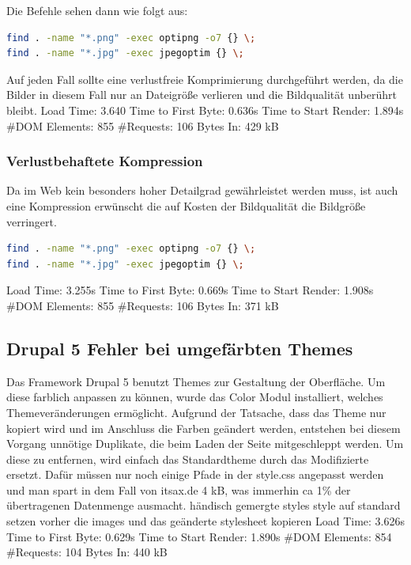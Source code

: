 Die Befehle sehen dann wie folgt aus:

\begin{lstlisting}[language=bash,label=Optimieren mit find,caption=Optimieren mit find]
find . -name "*.png" -exec optipng -o7 {} \;
find . -name "*.jpg" -exec jpegoptim {} \;
\end{lstlisting}
Auf jeden Fall sollte eine verlustfreie Komprimierung durchgeführt werden, da die Bilder in diesem Fall nur an Dateigröße verlieren und die Bildqualität unberührt bleibt. 
Load Time: 3.640
Time to First Byte: 0.636s %
Time to Start Render: 1.894s
\#DOM Elements: 855 	
\#Requests: 106 %
Bytes In: 429 kB %
\subsubsection{Verlustbehaftete Kompression} Da im Web kein besonders hoher Detailgrad gewährleistet werden muss, ist auch eine Kompression erwünscht die auf Kosten der Bildqualität die Bildgröße verringert. 
\begin{lstlisting}[language=bash,label=Optimieren mit find,caption=Optimieren mit find]
find . -name "*.png" -exec optipng -o7 {} \;
find . -name "*.jpg" -exec jpegoptim {} \;
\end{lstlisting}
Load Time: 3.255s
Time to First Byte: 0.669s %
Time to Start Render: 1.908s
\#DOM Elements: 855 	
\#Requests: 106 %
Bytes In: 371 kB %

\subsection{Drupal 5 Fehler bei umgefärbten Themes}
Das Framework Drupal 5 benutzt Themes zur Gestaltung der Oberfläche. Um diese farblich anpassen zu können, wurde das Color Modul installiert, welches Themeveränderungen ermöglicht. Aufgrund der Tatsache, dass das Theme nur kopiert wird und im Anschluss die Farben geändert werden, entstehen bei diesem Vorgang unnötige Duplikate, die beim Laden der Seite mitgeschleppt werden. Um diese zu entfernen, wird einfach das Standardtheme durch das Modifizierte ersetzt. Dafür müssen  nur noch einige Pfade in der style.css angepasst werden und man spart in dem Fall von itsax.de 4 kB, was immerhin ca 1\% der übertragenen Datenmenge ausmacht. 
händisch gemergte styles
style auf standard setzen
vorher die images und das geänderte stylesheet kopieren
Load Time: 3.626s
Time to First Byte: 0.629s %
Time to Start Render: 1.890s
\#DOM Elements: 854 	
\#Requests: 104 %
Bytes In: 440 kB %

